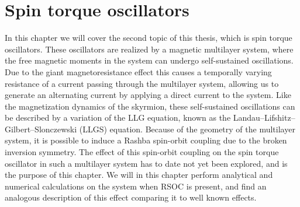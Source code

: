 \chapter{Spin torque oscillators} \label{chap:STO}
In this chapter we will cover the second topic of this thesis, which is spin torque oscillators. These oscillators are realized by a magnetic multilayer system, where the free magnetic moments in the system can undergo self-sustained oscillations. Due to the giant magnetoresistance effect this causes a temporally varying resistance of a current passing through the multilayer system, allowing us to generate an alternating current by applying a direct current to the system. Like the magnetization dynamics of the skyrmion, these self-sustained oscillations can be described by a variation of the LLG equation, known as the Landau--Lifshitz--Gilbert--Slonczewski (LLGS) equation. Because of the geometry of the multilayer system, it is possible to induce a Rashba spin-orbit coupling due to the broken inversion symmetry. The effect of this spin-orbit coupling on the spin torque oscillator in such a multilayer system has to date not yet been explored, and is the purpose of this chapter. We will in this chapter perform analytical and numerical calculations on the system when RSOC is present, and find an analogous description of this effect comparing it to well known effects.

